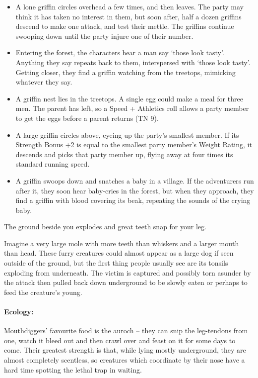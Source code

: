 \begin{multicols}{2}
\begin{itemize}
	\item{A lone griffin circles overhead a few times, and then leaves.
	The party may think it has taken no interest in them, but soon after, half a dozen griffins descend to make one attack, and test their mettle.
	The griffins continue swooping down until the party injure one of their number.}
	\item
	Entering the forest, the characters hear a man say `those look tasty'.
	Anything they say repeats back to them, interspersed with `those look tasty'.
	Getting closer, they find a griffin watching from the treetops, mimicking whatever they say.
	\item{A griffin nest lies in the treetops.
	A single egg could make a meal for three men.
	The parent has left, so a Speed + Athletics roll allows a party member to get the eggs before a parent returns (TN 9).}
	\item{A large griffin circles above, eyeing up the party's smallest member.
	If its Strength Bonus +2 is equal to the smallest party member's Weight Rating, it descends and picks that party member up, flying away at four times its standard running speed.}
	\item
	A griffin swoops down and snatches a baby in a village.
	If the adventurers run after it, they soon hear baby-cries in the forest, but when they approach, they find a griffin with blood covering its beak, repeating the sounds of the crying baby.

\end{itemize}

\label{mouthdigger}

\begin{boxtext}

	The ground beside you explodes and great teeth snap for your leg.

\end{boxtext}

Imagine a very large mole with more teeth than whiskers and a larger mouth than head.
These furry creatures could almost appear as a large dog if seen outside of the ground, but the first thing people usually see are its tonsils exploding from underneath.
The victim is captured and possibly torn asunder by the attack then pulled back down underground to be slowly eaten or perhaps to feed the creature's young.

\paragraph{Ecology:} Mouthdiggers' favourite food is the auroch -- they can snip the leg-tendons from one, watch it bleed out and then crawl over and feast on it for some days to come.
Their greatest strength is that, while lying mostly underground, they are almost completely scentless, so creatures which coordinate by their nose have a hard time spotting the lethal trap in waiting.


\end{multicols}

